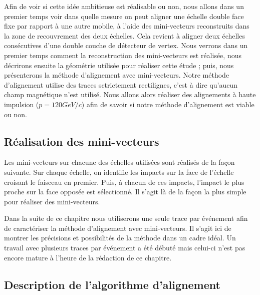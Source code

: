   Afin de voir si cette id\'ee ambitieuse est r\'ealisable ou non, nous allons dans un premier temps voir dans quelle mesure on peut aligner une \'echelle double face fixe par rapport \`a une autre mobile, \`a l'aide des mini-vecteurs reconstruits dans la zone de recouvrement des deux échelles. Cela revient \`a aligner deux \'echelles cons\'ecutives d'une double couche de d\'etecteur de vertex. Nous verrons dans un premier temps comment la reconstruction des mini-vecteurs est r\'ealis\'ee, nous d\'ecrirons ensuite la g\'eom\'etrie utilis\'ee pour r\'ealiser cette \'etude ; puis, nous pr\'esenterons la m\'ethode d'alignement avec mini-vecteurs. Notre m\'ethode d'alignement utilise des traces sctrictement rectilignes, c'est \`a dire qu'aucun champ magn\'etique n'est utilis\'e. Nous allons alors r\'ealiser des alignements \`a haute impulsion ($p = 120GeV/c$) afin de savoir si notre m\'ethode d'alignement est viable ou non.

  \subsection{R\'ealisation des mini-vecteurs}
  \label{realisation_MV}
  
  Les mini-vecteurs sur chacune des \'echelles utilis\'ees sont r\'ealis\'es de la façon suivante. Sur chaque \'echelle, on identifie les impacts sur la face de l'\'echelle croisant le faisceau en premier. Puis, \`a chacun de ces impacts, l'impact le plus proche sur la face oppos\'ee est s\'electionné. Il s'agit l\`a de la façon la plus simple pour r\'ealiser des mini-vecteurs.
  
  \medskip  
  
  Dans la suite de ce chapitre nous utiliserons une seule trace par \'ev\'enement afin de caract\'eriser la m\'ethode d'alignement avec mini-vecteurs. Il s'agit ici de montrer les pr\'ecisions et possibilit\'es de la m\'ethode dans un cadre id\'eal. Un travail avec plusieurs traces par \'ev\'enement a \'et\'e d\'ebut\'e mais celui-ci n'est pas encore mature \`a l'heure de la r\'edaction de ce chapitre.
 
  \subsection{Description de l'algorithme d'alignement}
  \label{sect:algo_align_MV}
 
